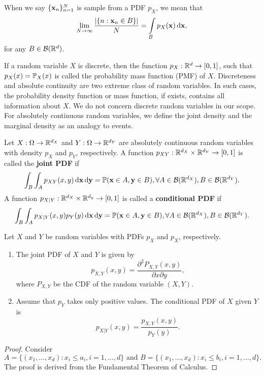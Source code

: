\begin{remark}
  When we say $\{\mathbf{x}_n\}_{n=1}^N$ is sample from a PDF $p_X$, we mean that
  $$\lim\limits_{N\to\infty}\dfrac{|\{n: \mathbf{x}_n\in B\}|}{N} = \int\limits_{B}p_X(\mathbf{x})\,\mathrm{d}\mathbf{x},$$
  for any $B\in\mathcal{B}(\mathbb{R}^d)$.
\end{remark}

If a random variable $X$ is discrete, then the function $p_X:\mathbb{R}^d\to[0,1]$, such that $p_X(x) = \mathbb{P}_X(x)$ is called the probability mass function (PMF) of $X$. Discreteness and absolute continuity are two extreme class of random variables. In such cases, the probability density function or mass function, if exists, contains all information about $X$. We do not concern discrete random variables in our scope. For absolutely continuous random variables, we define the joint density and the marginal density as an analogy to events.

\begin{definition}
  Let $X:\Omega\to\mathbb{R}^{d_X}$ and $Y:\Omega\to\mathbb{R}^{d_Y}$ are absolutely continuous random variables with density $p_X$ and $p_Y$, respectively. A function $p_{XY}:\mathbb{R}^{d_X}\times \mathbb{R}^{d_Y}\to[0,1]$ is called the \textbf{joint PDF} if
  \begin{equation}
    \int_B\int_{A}p_{XY}(x,y)\,\mathrm{d}\mathbf{x}\,\mathrm{d}\mathbf{y} = \mathbb{P}(\mathbf{x}\in A, \mathbf{y}\in B),\forall A\in\mathcal{B}(\mathbb{R}^{d_X}), B\in\mathcal{B}(\mathbb{R}^{d_Y}).
  \end{equation}
  A function $p_{X|Y}:\mathbb{R}^{d_X} \times \mathbb{R}^{d_y} \to[0,1]$ is called a \textbf{conditional PDF} if
  \begin{equation}
    \int_B \int_{A}p_{X|Y}(x, y) p_Y(y) \,\mathrm{d}\mathbf{x} \,\mathrm{d}\mathbf{y}  = \mathbb{P}(\mathbf{x}\in A , \mathbf{y}\in B), \forall A\in\mathcal{B}(\mathbb{R}^{d_X}), B\in\mathcal{B}(\mathbb{R}^{d_Y}).
  \end{equation}
\end{definition}

\begin{theorem}
  \label{theorem:algebra-of-density-functions}
  Let $X$ and $Y$ be random variables with PDFs $p_X$ and $p_X$, respectively.
  \begin{enumerate}[label=(\roman*), ref=(\roman*)]
    \item The joint PDF of $X$ and $Y$ is given by
          \begin{equation}
            p_{X,Y}(x,y)=\dfrac{\partial^2 P_{X,Y}(x,y)}{\partial x\partial y},
          \end{equation}
          where $P_{X,Y}$ be the CDF of the random variable $(X,Y)$.
    \item Assume that $p_Y$ takes only positive values. The conditional PDF of $X$ given $Y$ is
          \begin{equation}
            p_{X|Y}(x,y)=\dfrac{p_{X,Y}(x,y)}{p_Y(y)}.
          \end{equation}
  \end{enumerate}
\end{theorem}
\begin{proof}
  Consider
  $$A=\{(x_1,\ldots,x_d): x_i\le a_i, i=1,\ldots,d\} \text{ and } B=\{(x_1,\ldots,x_d): x_i\le b_i, i=1,\ldots,d\}.$$
  The proof is derived from the Fundamental Theorem of Calculus.
\end{proof}

